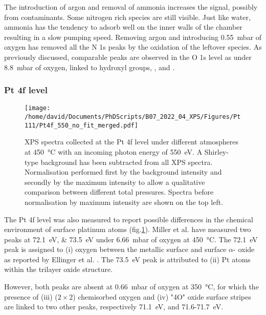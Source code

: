 The introduction of argon and removal of ammonia increases the  signal, possibly from contaminants.
Some nitrogen rich species are still visible.
Just like water, ammonia has the tendency to adsorb well on the inner walls of the chamber resulting in a slow pumping speed.
Removing argon and introducing \qty{0.55}{\milli\bar} of oxygen has removed all the N 1s peaks by the oxidation of the leftover  species.
As previously discussed, comparable peaks are observed in the O 1s level as under \qty{8.8}{\milli\bar} of oxygen, linked to hydroxyl groups, , and .

\subsubsection{Pt 4f level}

\begin{figure}[!htb]
    \centering
    \texttt{[image: /home/david/Documents/PhDScripts/B07\_2022\_04\_XPS/Figures/Pt111/Pt4f\_550\_no\_fit\_merged.pdf]}
    \caption{
        XPS spectra collected at the Pt 4f level under different atmospheres at \qty{450}{\degreeCelsius} with an incoming photon energy of \qty{550}{\eV}.
        A Shirley-type background has been subtracted from all XPS spectra.
        Normalisation performed first by the background intensity and secondly by the maximum intensity to allow a qualitative comparison between different total pressures.
        Spectra before normalisation by maximum intensity are shown on the top left.
    }
    \label{fig:Pt4fPt111}
\end{figure}

The Pt 4f level was also measured to report possible differences in the chemical environment of surface platinum atoms (fig.\ref{fig:Pt4fPt111}).
Miller et al. \parencite*{Miller2011} have measured two peaks at \qtylist{72.1;73.5}{\eV} under \qty{6.66}{\milli\bar} of oxygen at \qty{450}{\degreeCelsius}.
The \qty{72.1}{\eV} peak is assigned to (i) oxygen between the metallic surface and surface $\alpha$- oxide as reported by Ellinger et al. \parencite*{Ellinger2008}.
The \qty{73.5}{\eV} peak is attributed to (ii) Pt atoms within the trilayer oxide structure.

However, both peaks are absent at \qty{0.66}{\milli\bar} of oxygen at \qty{350}{\degreeCelsius}, for which the presence of (iii) ($2\times2$) chemisorbed oxygen and (iv) "4O" oxide surface stripes are linked to two other peaks, respectively \qty{71.1}{\eV}, and \num{71.6}-\qty{71.7}{\eV}.

